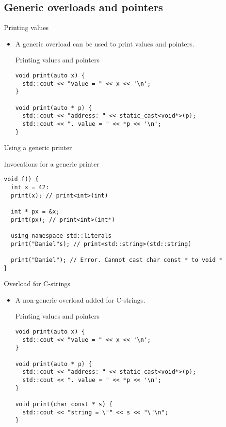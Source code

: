 \subsection{Generic overloads and pointers}

\begin{frame}[t,fragile]{Printing values}
\begin{itemize}
  \item A generic overload can be used to print values and pointers.

\begin{block}{Printing values and pointers}
\begin{lstlisting}
void print(auto x) {
  std::cout << "value = " << x << '\n';
}

void print(auto * p) {
  std::cout << "address: " << static_cast<void*>(p);
  std::cout << ". value = " << *p << '\n';
}
\end{lstlisting}
\end{block}

\end{itemize}
\end{frame}

\begin{frame}[t,fragile]{Using a generic printer}
\begin{block}{Invocations for a generic printer}
\begin{lstlisting}
void f() {
  int x = 42:
  print(x); // print<int>(int)

  int * px = &x;
  print(px); // print<int>(int*)

  using namespace std::literals
  print("Daniel"s); // print<std::string>(std::string)

  print("Daniel"); // Error. Cannot cast char const * to void *
}
\end{lstlisting}
\end{block}
\end{frame}

\begin{frame}[t,fragile]{Overload for C-strings}
\begin{itemize}
  \item A non-generic overload added for C-strings.

\begin{block}{Printing values and pointers}
\begin{lstlisting}
void print(auto x) {
  std::cout << "value = " << x << '\n';
}

void print(auto * p) {
  std::cout << "address: " << static_cast<void*>(p);
  std::cout << ". value = " << *p << '\n';
}

void print(char const * s) {
  std::cout << "string = \"" << s << "\"\n";
}
\end{lstlisting}
\end{block}
\end{itemize}
\end{frame}

